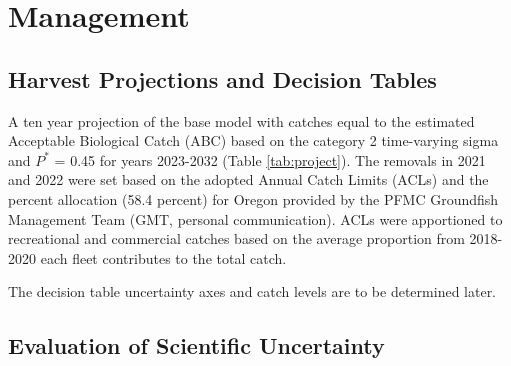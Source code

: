 \documentclass[11pt,
  english,
  a4paper,
]{article}
\begin{document}

\hypertarget{management}{%
\section{Management}\label{management}}

\leavevmode\tagmcend\tagstructend


\hypertarget{harvest-projections-and-decision-tables}{%
\subsection{Harvest Projections and Decision Tables}\label{harvest-projections-and-decision-tables}}

\leavevmode\tagmcend\tagstructend


A ten year projection of the base model with catches equal to the estimated Acceptable Biological Catch (ABC) based on the category 2 time-varying sigma and {\(P^*\)\leavevmode\tagmcend\tagstructend} = 0.45 for years 2023-2032 (Table \ref{tab:project}). The removals in 2021 and 2022 were set based on the adopted Annual Catch Limits (ACLs) and the percent allocation (58.4 percent) for Oregon provided by the PFMC Groundfish Management Team (GMT, personal communication). ACLs were apportioned to recreational and commercial catches based on the average proportion from 2018-2020 each fleet contributes to the total catch.

\leavevmode\tagmcend\tagstructend\par


The decision table uncertainty axes and catch levels are to be determined later.

\leavevmode\tagmcend\tagstructend\par


\hypertarget{evaluation-of-scientific-uncertainty}{%
\subsection{Evaluation of Scientific Uncertainty}\label{evaluation-of-scientific-uncertainty}}
\end{document}
